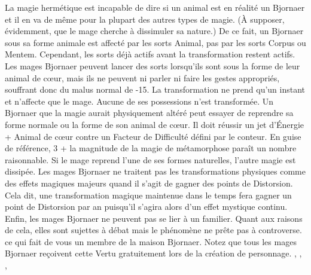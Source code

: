 {{{La magie hermétique est incapable de dire si un animal est en réalité un Bjornaer et il en va de même pour la plupart des autres types de magie. (À supposer, évidemment, que le mage cherche à dissimuler sa nature.) De ce fait, un Bjornaer sous sa forme animale est affecté par les sorts Animal, pas par les sorts Corpus ou Mentem. Cependant, les sorts déjà actifs avant la transformation restent actifs.
Les mages Bjornaer peuvent lancer des sorts lorsqu'ils sont sous la forme de leur animal de cœur, mais ils ne peuvent ni parler ni faire les gestes appropriés, souffrant donc du malus normal de -15.
La transformation ne prend qu'un instant et n'affecte que le mage. Aucune de ses possessions n'est transformée. Un Bjornaer que la magie aurait physiquement altéré peut essayer de reprendre sa forme normale ou la forme de son animal de cœur. Il doit réussir un jet d'Énergie + Animal de cœur contre un Facteur de Difficulté défini par le conteur. En guise de référence, 3 + la magnitude de la magie de métamorphose paraît un nombre raisonnable. Si le mage reprend l'une de ses formes naturelles, l'autre magie est dissipée.
Les mages Bjornaer ne traitent pas les transformations physiques comme des effets magiques majeurs quand il s'agit de gagner des points de Distorsion. Cela dit, une transformation magique maintenue dans le temps fera gagner un point de Distorsion par an puisqu'il s’agira alors d'un effet mystique continu.
Enfin, les mages Bjornaer ne peuvent pas se lier à un familier. Quant aux raisons de cela, elles sont sujettes à débat mais le phénomène ne prête pas à controverse.} ce qui fait de vous un membre de la maison Bjornaer. Notez que tous les mages Bjornaer reçoivent cette Vertu gratuitement lors de la création de personnage.
}\sep
{}\sep
{}\sep
{}}
